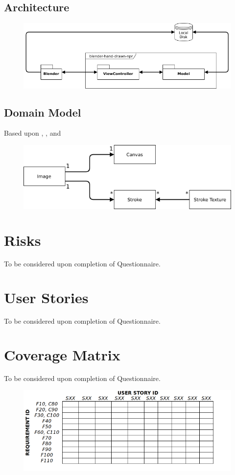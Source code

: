 \documentclass[a4paper,10pt]{article}
\begin{document}
\subsection{Architecture}

\begin{figure}[H]
\includegraphics[width=\textwidth]{arch}
\centering
\end{figure}

\subsection{Domain Model}

Based upon \citep{hertzmann2002}, \citep{salisbury1994}, \citep{salisbury1996} and \citep{winkenbach1994}
\begin{figure}[H]
\includegraphics[width=\textwidth]{domain}
\centering
\end{figure}

\section{Risks}

To be considered upon completion of Questionnaire.

\newpage
\section{User Stories} \label{userstories}

To be considered upon completion of Questionnaire.

\appendix
\newpage
\section{Coverage Matrix} \label{coveragematrix}

To be considered upon completion of Questionnaire.
\begin{figure}[h]
\includegraphics[width=\textwidth]{coverage_matrix}
\centering
\end{figure}

\newpage

\end{document}
